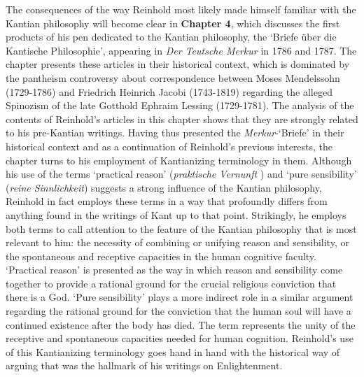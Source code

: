 The consequences of the way Reinhold most likely made himself familiar with the Kantian philosophy will become clear in \textbf{Chapter 4}, which discusses the first products of his pen dedicated to the Kantian philosophy, the `Briefe \"{u}ber die Kantische Philosophie', appearing in \textit{Der Teutsche Merkur} in 1786 and 1787. The chapter presents these articles in their historical context, which is dominated by the pantheism controversy about correspondence between Moses Mendelssohn (1729{-}1786) and Friedrich Heinrich Jacobi (1743{-}1819) regarding the alleged Spinozism of the late Gotthold Ephraim Lessing (1729{-}1781). The analysis of the contents of Reinhold's articles in this chapter shows that they are strongly related to his pre{-}Kantian writings. Having thus presented the \textit{Merkur}{-}`Briefe' in their historical context and as a continuation of Reinhold's previous interests, the chapter turns to his employment of Kantianizing terminology in them. Although his use of the terms `practical reason' (\textit{praktische Vernunft} ) and `pure sensibility' (\textit{reine Sinnlichkeit}) suggests a strong influence of the Kantian philosophy, Reinhold in fact employs these terms in a way that profoundly differs from anything found in the writings of Kant up to that point. Strikingly, he employs both terms to call attention to the feature of the Kantian philosophy that is most relevant to him: the necessity of combining or unifying reason and sensibility, or the spontaneous and receptive capacities in the human cognitive faculty. `Practical reason' is presented as the way in which reason and sensibility come together to provide a rational ground for the crucial religious conviction that there is a God. `Pure sensibility' plays a more indirect role in a similar argument regarding the rational ground for the conviction that the human soul will have a continued existence after the body has died. The term represents the unity of the receptive and spontaneous capacities needed for human cognition. Reinhold's use of this Kantianizing terminology goes hand in hand with the historical way of arguing that was the hallmark of his writings on Enlightenment. 

